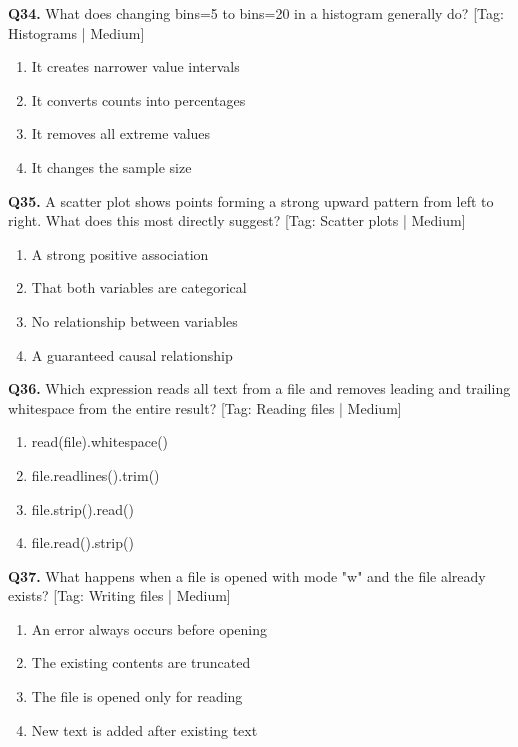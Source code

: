 \vspace{2mm}
\noindent\textbf{Q34.} What does changing bins=5 to bins=20 in a histogram generally do? \hfill [Tag: Histograms | Medium]
\begin{enumerate}[label=(\alph*),topsep=2pt,itemsep=1pt,partopsep=0pt,parsep=0pt]
    \item {It creates narrower value intervals}
    \item {It converts counts into percentages}
    \item {It removes all extreme values}
    \item {It changes the sample size}
\end{enumerate}
\vspace{2mm}
\noindent\textbf{Q35.} A scatter plot shows points forming a strong upward pattern from left to right. What does this most directly suggest? \hfill [Tag: Scatter plots | Medium]
\begin{enumerate}[label=(\alph*),topsep=2pt,itemsep=1pt,partopsep=0pt,parsep=0pt]
    \item {A strong positive association}
    \item {That both variables are categorical}
    \item {No relationship between variables}
    \item {A guaranteed causal relationship}
\end{enumerate}
\vspace{2mm}
\noindent\textbf{Q36.} Which expression reads all text from a file and removes leading and trailing whitespace from the entire result? \hfill [Tag: Reading files | Medium]
\begin{enumerate}[label=(\alph*),topsep=2pt,itemsep=1pt,partopsep=0pt,parsep=0pt]
    \item {read(file).whitespace()}
    \item {file.readlines().trim()}
    \item {file.strip().read()}
    \item {file.read().strip()}
\end{enumerate}
\vspace{2mm}
\noindent\textbf{Q37.} What happens when a file is opened with mode "w" and the file already exists? \hfill [Tag: Writing files | Medium]
\begin{enumerate}[label=(\alph*),topsep=2pt,itemsep=1pt,partopsep=0pt,parsep=0pt]
    \item {An error always occurs before opening}
    \item {The existing contents are truncated}
    \item {The file is opened only for reading}
    \item {New text is added after existing text}
\end{enumerate}

